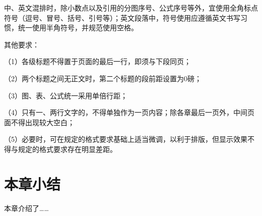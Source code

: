 中、英文混排时，除小数点以及引用的分图序号、公式序号等外，宜使用全角标点符号（逗号、冒号、括号、引号等）；英文段落中，符号使用应遵循英文书写习惯，统一使用半角符号，并规范使用空格。

其他要求：

（1）各级标题不得置于页面的最后一行，即须与下段同页；

（2）两个标题之间无正文时，第二个标题的段前距设置为0磅；

（3）图、表、公式统一采用单倍行距；

（4）只有一、两行文字的，不得单独作为一页内容；除各章最后一页外，中间页面不得出现较大空白；

（5）必要时，可在规定的格式要求基础上适当微调，以利于排版，但显示效果不得与规定的格式要求存在明显差距。


\section{本章小结}
本章介绍了……




